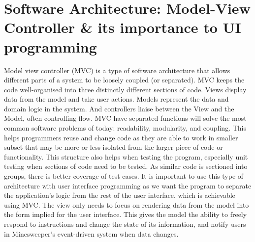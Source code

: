 \documentclass[12pt, a4]{report}
\begin{document}
	\section{Software Architecture: Model-View Controller & its importance to UI programming}
	\par Model view controller (MVC) is a type of software architecture that allows different parts of a system to be loosely coupled (or separated). 
	MVC keeps the code well-organised into three distinctly different sections of code. Views display data from the model and take user actions. 
	Models represent the data and domain logic in the system. And controllers liaise between the View and the Model, often controlling flow. 
	MVC have separated functions will solve the most common software problems of today: readability, modularity, and coupling. 
	This helps programmers reuse and change code as they are able to work in smaller subset that may be more or less isolated from the larger piece of code or 
	functionality. This structure also helps when testing the program, especially unit testing when sections of code need to be tested. As similar code is 
	sectioned into groups, there is better coverage of test cases. It is important to use this type of architecture with user interface programming as we want the program
	to separate the application's logic from the rest of the user interface, which is achievable using MVC. The view only needs to focus on rendering data from the model
	into the form implied for the user interface. This gives the model the ability to freely respond to instructions and change the state of its information, and notify users
	in Minesweeper's event-driven system when data changes. 
	
\end{document}
